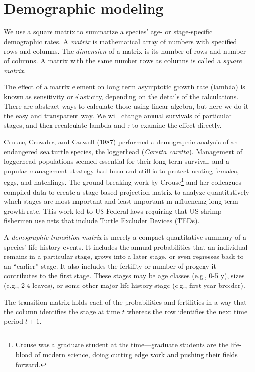 \documentclass[
  letterpaper,
  DIV=11,
  numbers=noendperiod]{scrreprt}
\begin{document}
\section{Demographic modeling}\label{demographic-modeling}

We use a square matrix to summarize a species' age- or stage-specific
demographic rates. A \emph{matrix} is mathematical array of numbers with
specified rows and columns. The \emph{dimension} of a matrix is its
number of rows and number of columns. A matrix with the same number rows
as columns is called a \emph{square matrix}.

The effect of a matrix element on long term asymptotic growth rate
(lambda) is known as sensitivity or elasticity, depending on the details
of the calculations. There are abstract ways to calculate those using
linear algebra, but here we do it the easy and transparent way. We will
change annual survivals of particular stages, and then recalculate
lambda and r to examine the effect directly.

Crouse, Crowder, and Caswell (1987) performed a demographic analysis of
an endangered sea turtle species, the loggerhead (\emph{Caretta
caretta}). Management of loggerhead populations seemed essential for
their long term survival, and a popular management strategy had been and
still is to protect nesting females, eggs, and hatchlings. The ground
breaking work by Crouse\footnote{Crouse was a graduate student at the
  time---graduate students are the life-blood of modern science, doing
  cutting edge work and pushing their fields forward.} and her
colleagues compiled data to create a stage-based projection matrix to
analyze quantitatively which stages are most important and least
important in influencing long-term growth rate. This work led to US
Federal laws requiring that US shrimp fishermen use nets that include
Turtle Excluder Devices
(\href{https://www.fisheries.noaa.gov/southeast/bycatch/turtle-excluder-device-regulations}{TEDs}).

A \emph{demographic transition matrix} is merely a compact quantitative
summary of a species' life history events. It includes the annual
probabilities that an individual remains in a particular stage, grows
into a later stage, or even regresses back to an ``earlier'' stage. It
also includes the fertility or number of progeny it contributes to the
first stage. These stages may be age classes (e.g., 0-5 y), sizes (e.g.,
2-4 leaves), or some other major life history stage (e.g., first year
breeder).

The transition matrix holds each of the probabilities and fertilities in
a way that the column identifies the stage at time \(t\) whereas the row
identifies the next time period \(t+1\).
\end{document}
